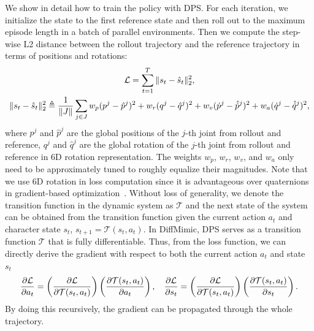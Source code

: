 We show in detail how to train the policy with DPS. For each iteration, we initialize the state to the first reference state and then roll out to the maximum episode length in a batch of parallel environments. Then we compute the step-wise L2 distance between the rollout trajectory and the reference trajectory in terms of positions and rotations:
\begin{equation}
\begin{gathered}\label{eq:reward}
\tiny
    \mathcal{L} = \sum_{t=1}^T \| s_t - \hat{s}_t\|_2^2, \\
    \| s_t - \hat{s}_t\|_2^2 \triangleq \frac{1}{\|J\|}\sum_{j\in J} w_p(p^j - \hat{p}^j)^2 + w_r(q^j - \hat{q}^j)^2 + w_v(\dot{p}^j - \hat{\dot{p}}^j)^2 + w_a(\dot{q}^j - \hat{\dot{q}}^j)^2, 
\end{gathered}
\end{equation}
where $p^j$ and $\hat{p}^j$ are the global positions of the $j$-th joint from rollout and reference,  $q^j$ and $\hat{q}^j$ are the global rotation of the $j$-th joint from rollout and reference in 6D rotation representation. The weights $w_p$, $w_r$, $w_v$, and $w_a$ only need to be approximately tuned to roughly equalize their magnitudes. Note that we use 6D rotation in loss computation since it is advantageous over quaternions in gradient-based optimization~\citep{zhou2019continuity}. Without loss of generality, we denote the transition function in the dynamic system as $\mathcal{T}$ and the next state of the system can be obtained from the transition function given the current action $a_t$ and character state $s_t$, $s_{t+1} = \mathcal{T}(s_t, a_t)$. In DiffMimic, DPS serves as a transition function $\mathcal{T}$ that is fully differentiable. Thus, from the loss function, we can directly derive the gradient with respect to both the current action $a_t$ and state $s_t$
\begin{equation}
\small
    \frac{\partial \mathcal{L}}{\partial a_t} = \left(\frac{\partial \mathcal{L}}{ \partial\mathcal{T} (s_t, a_t)}\right)\left(\frac{\partial \mathcal{T}(s_t, a_t)}{\partial a_t}\right),\quad \frac{\partial \mathcal{L}}{\partial s_t} = \left(\frac{\partial \mathcal{L}}{ \partial\mathcal{T} (s_t, a_t)}\right)\left(\frac{\partial \mathcal{T}(s_t, a_t)}{\partial s_t}\right).
\end{equation}
By doing this recursively, the gradient can be propagated through the whole trajectory. 











